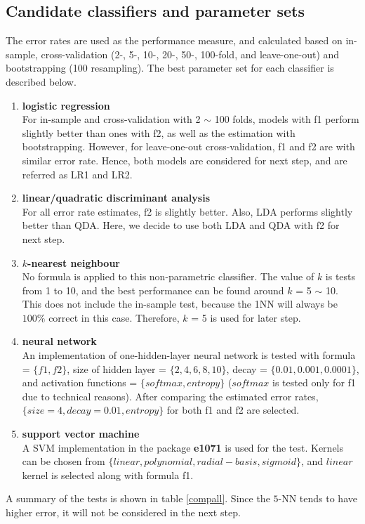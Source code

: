 \documentclass[a4paper,12pt]{article}
\begin{document}
\subsection*{\bf Candidate classifiers and parameter sets}
The error rates are used as the performance measure, and calculated based on in-sample, cross-validation (2-, 5-, 10-, 20-, 50-, 100-fold, and leave-one-out) and bootstrapping (100 resampling).  The best parameter set for each classifier is described below.

\begin{enumerate}
\item {\bf logistic regression}\\
For in-sample and cross-validation with 2 $\sim$ 100 folds, models with f1 perform slightly better than ones with f2, as well as the estimation with bootstrapping.  However, for leave-one-out cross-validation, f1 and f2 are with similar error rate.  Hence, both models are considered for next step, and are referred as LR1 and LR2.

\item {\bf linear/quadratic discriminant analysis}\\
For all error rate estimates, f2 is slightly better. Also, LDA performs slightly better than QDA.  Here, we decide to use both LDA and QDA with f2 for next step.

\item {\bf $k$-nearest neighbour}\\
No formula is applied to this non-parametric classifier.  The value of $k$ is tests from 1 to 10, and the best performance can be found around $k$ = 5 $\sim$ 10.  This does not include the in-sample test, because the 1NN will always be $100\%$ correct in this case.  Therefore, $k$ = 5 is used for later step.

\item {\bf neural network}\\
An implementation of one-hidden-layer neural network is tested with formula = $\{f1,f2\}$, size of hidden layer = $\{2,4,6,8,10\}$, decay = $\{0.01, 0.001, 0.0001\}$, and activation functions = $\{softmax, entropy\}$ ($softmax$ is tested only for f1 due to technical reasons).  After comparing the estimated error rates, $\{size = 4, decay = 0.01, entropy\}$ for both f1 and f2 are selected.

\item {\bf support vector machine}\\
A SVM implementation in the package {\bf e1071} is used for the test.  Kernels can be chosen from $\{linear, polynomial, radial-basis, sigmoid\}$, and $linear$ kernel is selected along with formula f1.

\end{enumerate}
A summary of the tests is shown in table \ref{compall}.  Since the $5$-NN tends to have higher error, it will not be considered in the next step.
\end{document}
